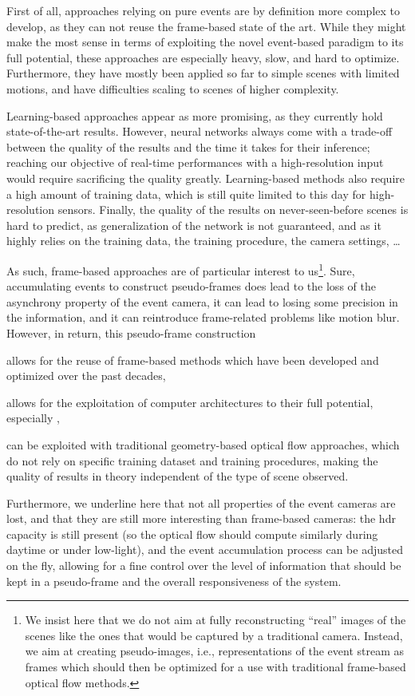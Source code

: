 First of all, approaches relying on pure events are by definition more complex to develop, as they can not reuse the frame-based state of the art. While they might make the most sense in terms of exploiting the novel event-based paradigm to its full potential, these approaches are especially heavy, slow, and hard to optimize. Furthermore, they have mostly been applied so far to simple scenes with limited motions, and have difficulties scaling to scenes of higher complexity.

Learning-based approaches appear as more promising, as they currently hold state-of-the-art results. However, neural networks always come with a trade-off between the quality of the results and the time it takes for their inference; reaching our objective of real-time performances with a high-resolution input would require sacrificing the quality greatly. Learning-based methods also require a high amount of training data, which is still quite limited to this day for high-resolution sensors. Finally, the quality of the results on never-seen-before scenes is hard to predict, as generalization of the network is not guaranteed, and as it highly relies on the training data, the training procedure, the camera settings, \dots

As such, frame-based approaches are of particular interest to us\footnote{We insist here that we do not aim at fully reconstructing ``real'' images of the scenes like the ones that would be captured by a traditional camera. Instead, we aim at creating pseudo-images, i.e., representations of the event stream as frames which should then be optimized for a use with traditional frame-based optical flow methods.}. Sure, accumulating events to construct pseudo-frames does lead to the loss of the asynchrony property of the event camera, it can lead to losing some precision in the information, and it can reintroduce frame-related problems like motion blur. However, in return, this pseudo-frame construction
\begin{enumerate*}[label=\textbf{(\arabic*)}]
  \item allows for the reuse of frame-based methods which have been developed and optimized over the past decades,
  \item allows for the exploitation of computer architectures to their full potential, especially ,
  \item can be exploited with traditional geometry-based optical flow approaches, which do not rely on specific training dataset and training procedures, making the quality of results in theory independent of the type of scene observed.
\end{enumerate*}
Furthermore, we underline here that not all properties of the event cameras are lost, and that they are still more interesting than frame-based cameras: the \acrshort{hdr} capacity is still present (so the optical flow should compute similarly during daytime or under low-light), and the event accumulation process can be adjusted on the fly, allowing for a fine control over the level of information that should be kept in a pseudo-frame and the overall responsiveness of the system.


